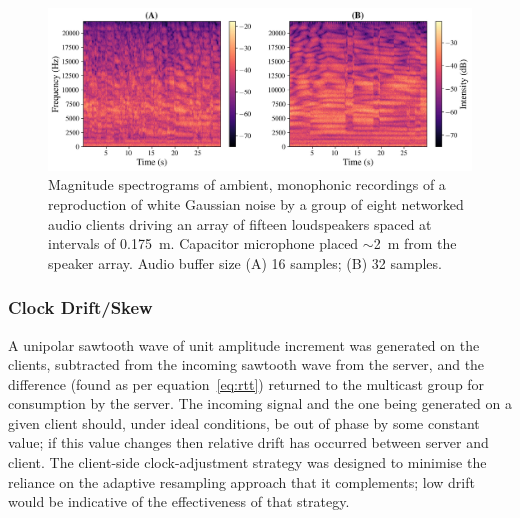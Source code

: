 \begin{figure}[h]
    \centering
    \includegraphics[width=\textwidth]{figures/wgn_specgram_16_32}
    \caption{
        Magnitude spectrograms of ambient, monophonic recordings of a
        reproduction of white Gaussian noise by a group of eight networked
        audio clients driving an array of fifteen loudspeakers spaced at
        intervals of \qty{.175}{\m}.
        Capacitor microphone placed $\sim$\qty{2}{\m} from the
        speaker array.
        Audio buffer size (A) 16 samples; (B) 32 samples.
    }
    \label{fig:spectrograms}
\end{figure}

\subsubsection{Clock Drift/Skew}
A unipolar sawtooth wave of unit amplitude increment was generated on the
clients, subtracted from the incoming sawtooth wave from the server, and the
difference (found as per equation~\eqref{eq:rtt}) returned to the multicast
group for consumption by the server.
The incoming signal and the one being generated on a given client should, under
ideal conditions, be out of phase by some constant value;
if this value changes then relative drift has occurred between server and
client.
The client-side clock-adjustment strategy was designed to minimise the reliance
on the adaptive resampling approach that it complements;
low drift would be indicative of the effectiveness of that strategy.

